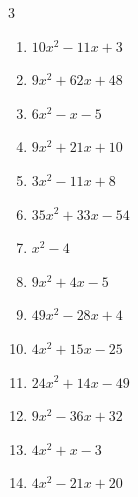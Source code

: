 \begin{multicols}{3}
\begin{enumerate}
        \phantom{$=(4x-7)(x+1)$}

  \item $10x^{2}-11x+3$

        \phantom{$=(2x-1)(5x-3)$}

\columnbreak %

\resetques

  \item $9x^{2}+62x+48$

        \phantom{$=(9x+8)(x+6)$}

  \item $6x^{2}-x-5$

        \phantom{$=(x-1)(6x+5)$}

  \item $9x^{2}+21x+10$

        \phantom{$=(3x+5)(3x+2)$}

  \item $3x^{2}-11x+8$

        \phantom{$=(3x-8)(x-1)$}

  \item $35x^{2}+33x-54$

        \phantom{$=(7x-6)(5x+9)$}

  \item $x^{2}-4$

        \phantom{$=(x+2)(x-2)$}

  \item $9x^{2}+4x-5$

        \phantom{$=(x+1)(9x-5)$}

  \item $49x^{2}-28x+4$


  \item $4x^{2}+15x-25$

        \phantom{$=(4x-5)(x+5)$}

  \item $24x^{2}+14x-49$

        \phantom{$=(4x+7)(6x-7)$}

\columnbreak %

  \item $9x^{2}-36x+32$

        \phantom{$=(3x-8)(3x-4)$}

  \item $4x^{2}+x-3$

        \phantom{$=(4x-3)(x+1)$}

  \item $4x^{2}-21x+20$


\end{enumerate}
\end{multicols}
